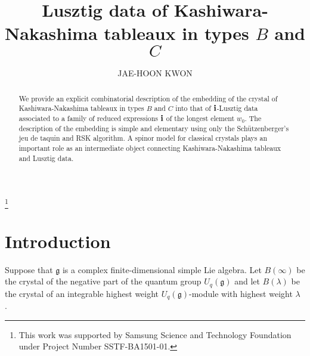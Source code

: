 \documentclass[leqno,11pt]{amsart}
\numberwithin{equation}{section}
\newcommand{\bs}{\boldsymbol}
\newcommand{\bi}{\bs{\rm i}}
\newcommand{\g}{\mathfrak{g}}
\newcommand{\la}{\lambda}
\newcommand{\red}[1]{{\color{red}#1}}
\begin{document}
\title[Lusztig data of KN tableaux]
{Lusztig data of Kashiwara-Nakashima tableaux in types $B$ and $C$}
\author{JAE-HOON KWON}

\address{Department of Mathematical Sciences, Seoul National University, Seoul 08826, Korea}


\thanks{This work was supported by Samsung Science and Technology Foundation under Project Number SSTF-BA1501-01.}


\begin{abstract}
We provide an explicit combinatorial description of the embedding of the crystal of Kashiwara-Nakashima tableaux in types $B$ and $C$ into that of $\bi$-Lusztig data associated to a family of reduced expressions $\bi$ of the longest element $w_0$. The description of the embedding is simple and elementary using only the Sch\"{u}tzenberger's jeu de taquin and RSK algorithm.
A spinor model for classical crystals plays an important role as an intermediate object connecting Kashiwara-Nakashima tableaux and Lusztig data. 
\end{abstract}

\maketitle
\setcounter{tocdepth}{2}



\section{Introduction}
Suppose that $\g$ is a complex finite-dimensional simple Lie algebra. Let $B(\infty)$ be the crystal of the negative part of the quantum group $U_q(\g)$ and let $B(\la)$ be the crystal of an integrable highest weight $U_q(\g)$-module with highest weight $\la$ \cite{Kas91}.%
\end{document}
